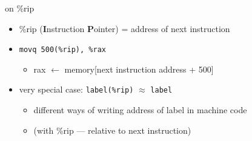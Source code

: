 
\begin{frame}{on \%rip}
    \begin{itemize}
        \item \%rip (\textbf{I}nstruction \textbf{P}ointer) = address of next instruction
        \item {\tt {\keywordstyle movq} 500(\%rip), \%rax}
            \begin{itemize}
                \item rax $\leftarrow$ memory[next instruction address + 500]
            \end{itemize}
        \item<2> very special case: {\tt label(\%rip)} $\approx$ {\tt label}
            \begin{itemize}
            \item different ways of writing address of label in machine code
            \item (with \%rip --- relative to next instruction)
            \end{itemize}
    \end{itemize}
\end{frame}


